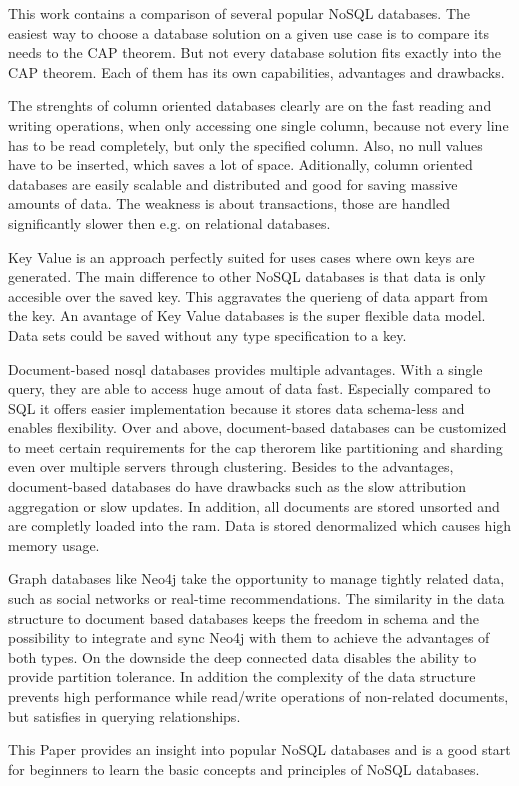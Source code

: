 This work contains a comparison of several popular NoSQL databases.
The easiest way to choose a database solution on a given use case is to compare its needs to the CAP theorem.
But not every database solution fits exactly into the CAP theorem.
Each of them has its own capabilities, advantages and drawbacks.

The strenghts of column oriented databases clearly are on the fast reading and writing operations, when only accessing one single column, because not every line has to be read completely, but only the specified column.
Also, no null values have to be inserted, which saves a lot of space. Aditionally, column oriented databases are easily scalable and distributed and good for saving massive amounts of data.
The weakness is about transactions, those are handled significantly slower then e.g. on relational databases.

Key Value is an approach perfectly suited for uses cases where own keys are generated.
The main difference to other NoSQL databases is that data is only accesible over the saved key.
This aggravates the querieng of data appart from the key.
An avantage of Key Value databases is the super flexible data model.
Data sets could be saved without any type specification to a key.

Document-based nosql databases provides multiple advantages. With a single query, they are able to access huge amout of data fast. Especially compared to SQL it offers easier implementation because it stores data schema-less and enables flexibility. Over and above, document-based databases can be customized to meet certain requirements for the cap therorem like partitioning and sharding even over multiple servers through clustering. Besides to the advantages, document-based databases do have drawbacks such as the slow attribution aggregation or slow updates. In addition, all documents are stored unsorted and are completly loaded into the ram. Data is stored denormalized which causes high memory usage.

Graph databases like Neo4j take the opportunity to manage tightly related data, such as social networks or real-time recommendations. The similarity in the data structure to document based databases keeps the freedom in schema and the possibility to integrate and sync Neo4j with them to achieve the advantages of both types.
On the downside the deep connected data disables the ability to provide partition tolerance. In addition the complexity of the data structure prevents high performance while read/write operations of non-related documents, but satisfies in querying relationships.

This Paper provides an insight into popular NoSQL databases and is a good start for beginners to learn the basic concepts and principles of NoSQL databases.